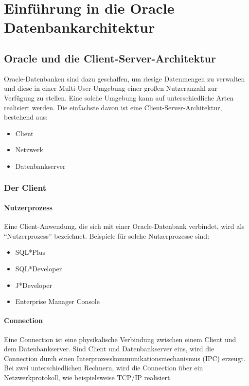 \chapter{Einführung in die Oracle Datenbankarchitektur}
\chaptertoc{}
\cleardoubleevenpage
    \section{Oracle und die Client-Server-Architektur}
      Oracle-Datenbanken sind dazu geschaffen, um riesige Datenmengen zu verwalten und diese in einer Multi-User-Umgebung einer großen Nutzeranzahl zur Verfügung zu stellen. Eine solche Umgebung kann auf unterschiedliche Arten realisiert werden. Die einfachste davon ist eine  Client-Server-Architektur, bestehend aus:
      \begin{itemize}
        \item Client
        \item Netzwerk
        \item Datenbankserver
      \end{itemize}


      \subsection{Der Client}
        \subsubsection{Nutzerprozess}
          Eine Client-Anwendung, die sich mit einer Oracle-Datenbank verbindet, wird als \enquote{Nutzerprozess} bezeichnet. Beispiele für solche Nutzerprozesse sind:
          \begin{itemize}
            \item SQL*Plus
            \item SQL*Developer
            \item J*Developer
            \item Enterprise Manager Console
          \end{itemize}
        \subsubsection{Connection}
          Eine Connection ist eine physikalische Verbindung zwischen einem Client und dem Datenbankserver. Sind Client und Datenbankserver eins, wird die Connection durch einen Interprozesskommunikationsmechanismus (IPC) erzeugt. Bei zwei unterschiedlichen Rechnern, wird die Connection über ein Netzwerkprotokoll, wie beispielsweise TCP/IP realisiert.

